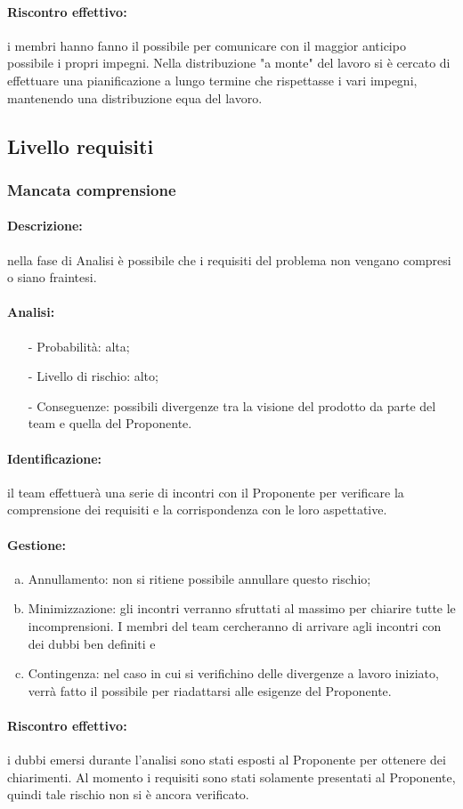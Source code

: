 \documentclass[../PianoProgetto.tex]{subfiles}
\begin{document}
	\paragraph*{Riscontro effettivo:} i membri hanno fanno il possibile per comunicare con il maggior anticipo possibile i propri impegni. Nella distribuzione "a monte" del lavoro si è cercato di effettuare una pianificazione a lungo termine che rispettasse i vari impegni, mantenendo una distribuzione equa del lavoro.


\subsection{Livello requisiti}

\subsubsection{Mancata comprensione}

	\paragraph*{Descrizione:} nella fase di Analisi è possibile che i requisiti del problema non vengano compresi o siano fraintesi.
	
	\paragraph*{Analisi:}
	\begin{itemize}
		\item[-] Probabilità: alta;
		\item[-] Livello di rischio: alto;
		\item[-] Conseguenze: possibili divergenze tra la visione del prodotto da parte del team e quella del Proponente.
	\end{itemize}	
		
	\paragraph*{Identificazione:} il team effettuerà una serie di incontri con il Proponente per verificare la comprensione dei requisiti e la corrispondenza con le loro aspettative.
	
	\paragraph*{Gestione:}
	\begin{enumerate}[(a)]
		\item Annullamento: non si ritiene possibile annullare questo rischio;
		\item Minimizzazione: gli incontri verranno sfruttati al massimo per chiarire tutte le incomprensioni. I membri del team cercheranno di arrivare agli incontri con dei dubbi ben definiti e 
		\item Contingenza: nel caso in cui si verifichino delle divergenze a lavoro iniziato, verrà fatto il possibile per riadattarsi alle esigenze del Proponente.
	\end{enumerate}	
	
	\paragraph*{Riscontro effettivo:} i dubbi emersi durante l’analisi sono stati esposti al Proponente per ottenere dei chiarimenti. Al momento i requisiti sono stati solamente presentati al Proponente, quindi tale rischio non si è ancora verificato.

			
\end{document}
